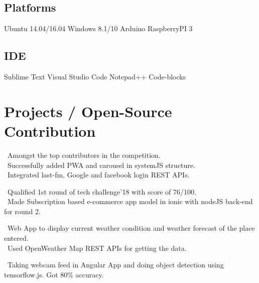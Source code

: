\documentclass[]{deedy-resume-openfont}
\begin{document}
\begin{minipage}[t]{0.32\textwidth}
    \subsection{Platforms}
    Ubuntu 14.04/16.04 \textbullet{} Windows 8.1/10 \newline \textbullet{} Arduino \textbullet{} RaspberryPI 3
    
    \sectionsep
    
    \subsection{IDE}
    Sublime Text \textbullet{} Visual Studio Code \newline \textbullet{} Notepad++ \textbullet{} Code-blocks  
    
    \sectionsep
    
    \section{Projects / Open-Source Contribution}
    
    \textbullet\ Amongst the top contributors in the competition.\\
    \textbullet\ Successfully added PWA and carousel in systemJS  structure.\\
    \textbullet\ Integrated last-fm, Google and facebook login REST APIs.
    \sectionsep
    
    \textbullet\ Qualified 1st round of tech challenge'18 with score of 76/100.\\
    \textbullet\ Made Subscription based e-commerce app model in ionic with nodeJS back-end for round 2. 
    \sectionsep
    
    \textbullet\  Web App to display current weather condition and weather forecast of the place entered.\\
    \textbullet\ Used OpenWeather Map REST APIs for getting the data.\\
    \sectionsep
    
    \textbullet\  Taking webcam feed in Angular App and doing object detection using tensorflow.js. Got 80\% accuracy.\\
    \sectionsep
    
    
    
    
    
    \end{minipage} 
\end{document}
